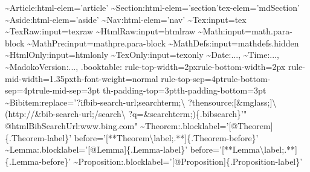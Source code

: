 \documentclass{book}
\begin{document}
\begin{mdPre}[class={para-block,pre-fenced},data-line={3829},data-line-code={3830}]
{\prebr{}
{\textasciitilde}Article:html-elem={'}article{'}\prebr{}
{\textasciitilde}Section:html-elem={'}section{'}tex-elem={'}mdSection{'}\prebr{}
{\textasciitilde}Aside:html-elem={'}aside{'}\prebr{}
{\textasciitilde}Nav:html-elem={'}nav{'}\prebr{}
\prebr{}
{\textasciitilde}Tex:input=tex\prebr{}
{\textasciitilde}TexRaw:input=texraw\prebr{}
{\textasciitilde}HtmlRaw:input=htmlraw\prebr{}
{\textasciitilde}Math:input=math.para-block\prebr{}
{\textasciitilde}MathPre:input=mathpre.para-block\prebr{}
{\textasciitilde}MathDefs:input=mathdefs.hidden\prebr{}
{\textasciitilde}HtmlOnly:input=htmlonly\prebr{}
{\textasciitilde}TexOnly:input=texonly\prebr{}
\prebr{}
{\textasciitilde}Date:...,\prebr{}
{\textasciitilde}Time:...,\prebr{}
{\textasciitilde}MadokoVersion:...,\prebr{}
\prebr{}
.booktable:\prebr{}
rule-top-width=2pxrule-bottom-width=2px\prebr{}
rule-mid-width=1.35pxth-font-weight=normal\prebr{}
rule-top-sep=4ptrule-bottom-sep=4ptrule-mid-sep=3pt\prebr{}
th-padding-top=3ptth-padding-bottom=3pt\prebr{}
\prebr{}
{\textasciitilde}Bibitem:replace={'}?ifbib-search-url;searchterm;{\textbackslash}\prebr{}
?thensource;[{\&}mglass;]{\textbackslash}\prebr{}
(http://{\&}bib-search-url;/search{\textbackslash}\prebr{}
?q={\&}searchterm;)\{.bibsearch\}{'}{"}\prebr{}
@htmlBibSearchUrl:www.bing.com{"}\prebr{}
\prebr{}
{\textasciitilde}Theorem:.blocklabel={'}[@Theorem]\{.Theorem-label\}{'}\prebr{}
before={'}[**Theorem{\textbackslash}label;.**]\{.Theorem-before\}{'}\prebr{}
{\textasciitilde}Lemma:.blocklabel={'}[@Lemma]\{.Lemma-label\}{'}\prebr{}
before={'}[**Lemma{\textbackslash}label;.**]\{.Lemma-before\}{'}\prebr{}
{\textasciitilde}Proposition:.blocklabel={'}[@Proposition]\{.Proposition-label\}{'}\prebr{}
}
\end{mdPre}
\end{document}
